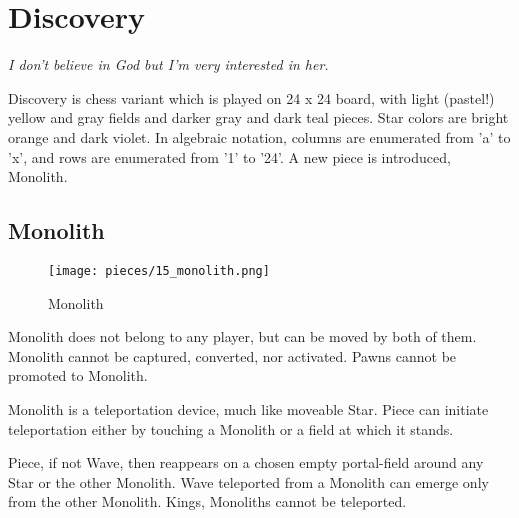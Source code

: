 

\chapter*{Discovery}

\begin{flushright}
\parbox{0.8\textwidth}{
\emph{I don’t believe in God but I’m very interested in her. \\
 } }
\end{flushright}

\noindent
Discovery is chess variant which is played on 24 x 24 board, with
light (pastel!) yellow and gray fields and darker gray and dark teal
pieces. Star colors are bright orange and dark violet. In algebraic
notation, columns are enumerated from 'a' to 'x', and rows are
enumerated from '1' to '24'. A new piece is introduced, Monolith.

\clearpage %

\section*{Monolith}

\noindent
\begin{wrapfigure}[11]{l}{0.4\textwidth}
\centering
\texttt{[image: pieces/15\_monolith.png]}
\caption{Monolith}
\label{fig:15_monolith}
\end{wrapfigure}
Monolith does not belong to any player, but can be moved by both of them.
Monolith cannot be captured, converted, nor activated.
Pawns cannot be promoted to Monolith.

Monolith is a teleportation device, much like moveable Star. Piece can
initiate teleportation either by touching a Monolith or a field at which
it stands.

Piece, if not Wave, then reappears on a chosen empty portal-field around
any Star or the other Monolith. Wave teleported from a Monolith can emerge
only from the other Monolith. Kings, Monoliths cannot be teleported.

